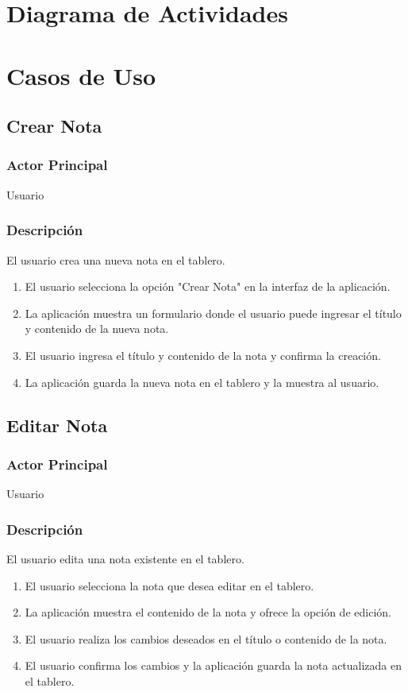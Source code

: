 \section{Diagrama de Actividades}



\section{Casos de Uso}
\subsection{Crear Nota}
\subsubsection{Actor Principal}
Usuario

\subsubsection{Descripción}
El usuario crea una nueva nota en el tablero.

\begin{enumerate}
  \item El usuario selecciona la opción "Crear Nota" en la interfaz de la aplicación.
  \item La aplicación muestra un formulario donde el usuario puede ingresar el título y contenido de la nueva nota.
  \item El usuario ingresa el título y contenido de la nota y confirma la creación.
  \item La aplicación guarda la nueva nota en el tablero y la muestra al usuario.
\end{enumerate}

\subsection{Editar Nota}
\subsubsection{Actor Principal}
Usuario

\subsubsection{Descripción}
El usuario edita una nota existente en el tablero.

\begin{enumerate}
  \item El usuario selecciona la nota que desea editar en el tablero.
  \item La aplicación muestra el contenido de la nota y ofrece la opción de edición.
  \item El usuario realiza los cambios deseados en el título o contenido de la nota.
  \item El usuario confirma los cambios y la aplicación guarda la nota actualizada en el tablero.
\end{enumerate}

